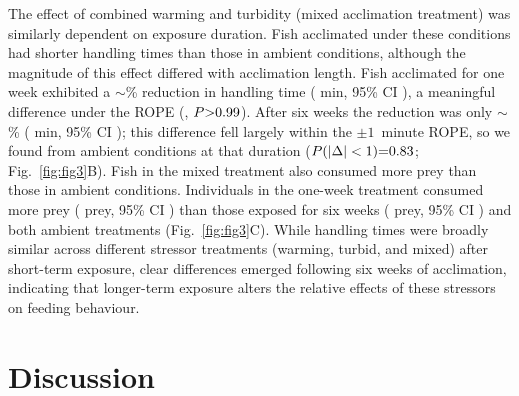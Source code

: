 \documentclass[ASNA,twocolumn]{USG} %
\begin{document}
The effect of combined warming and turbidity (mixed acclimation treatment) was similarly dependent on exposure duration. Fish acclimated under these conditions had shorter handling times than those in ambient conditions, although the magnitude of this effect differed with acclimation length. Fish acclimated for one week exhibited a $\sim$\RedMixOne\% reduction in handling time (\HtMixOne{} min, 95\% CI \HtMixOneCI), a meaningful difference under the ROPE (\vRopeMixOne, $P{>}0.99$). After six weeks the reduction was only $\sim$\RedMixSix\% (\HtMixSix{} min, 95\% CI \HtMixSixCI); this difference fell largely within the $\pm1$~minute ROPE, so we found \vRopeMixSix{} from ambient conditions at that duration ($P(|\Delta|<1){=}0.83$; Fig.~\ref{fig:fig3}B). Fish in the mixed treatment also consumed more prey than those in ambient conditions. Individuals in the one-week treatment consumed more prey (\EatMixOne{} prey, 95\% CI \EatMixOneCI) than those exposed for six weeks (\EatMixSix{} prey, 95\% CI \EatMixSixCI) and both ambient treatments (Fig.~\ref{fig:fig3}C). While handling times were broadly similar across different stressor treatments (warming, turbid, and mixed) after short-term exposure, clear differences emerged following six weeks of acclimation, indicating that longer-term exposure alters the relative effects of these stressors on feeding behaviour.

\begin{table}[!t]\centering
\caption{Comparisons of handling-time differences for a fish of median weight, using a $\pm1$~minute region of practical equivalence (ROPE; see Methods). Each cell gives the posterior difference in handling time relative to ambient (median and $95\%$ credible interval, minutes), evaluated as an \emph{experimental} effect (varying the experimental condition with acclimation held at ambient) and as an \emph{acclimation} effect (varying the acclimation condition with the experiment held at ambient); the final row is the acclimation duration contrast, which has no experimental analogue. Asterisks give the strength of evidence that the difference lies \emph{outside} the ROPE (a meaningful difference): ${}^{*}\,P(|\Delta|<1)\le0.05$, ${}^{**}\le0.01$, ${}^{***}\le0.001$; no asterisk indicates the difference is not distinguishable from practical equivalence.\label{tab:rope}}

\end{table}

\section{Discussion}
\end{document}
